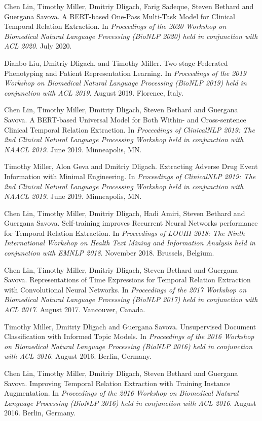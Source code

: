 \documentclass[letterpaper]{article}
\renewenvironment{itemize}{
  \begin{list}{}{
    \setlength{\leftmargin}{1.5em}
  }
}{
  \end{list}
}
\begin{document}
\begin{itemize}
\item Chen Lin, Timothy Miller, Dmitriy Dligach, Farig Sadeque, Steven Bethard and Guergana Savova. A BERT-based One-Pass Multi-Task Model for Clinical Temporal Relation Extraction. In \emph{Proceedings of the 2020 Workshop on Biomedical Natural Language Processing (BioNLP 2020) held in conjunction with ACL 2020}. July 2020.
\item Dianbo Liu, Dmitriy Dligach, and Timothy Miller. Two-stage Federated Phenotyping and Patient Representation Learning. In \emph{Proceedings of the 2019 Workshop on Biomedical Natural Language Processing (BioNLP 2019) held in conjunction with ACL 2019}. August 2019. Florence, Italy.
\item Chen Lin, Timothy Miller, Dmitriy Dligach, Steven Bethard and Guergana Savova. A BERT-based Universal Model for Both Within- and Cross-sentence Clinical Temporal Relation Extraction. In \emph{Proceedings of ClinicalNLP 2019: The 2nd Clinical Natural Language Processing Workshop held in conjunction with NAACL 2019}. June 2019. Minneapolis, MN.
\item Timothy Miller, Alon Geva and Dmitriy Dligach. Extracting Adverse Drug Event Information with Minimal Engineering. In \emph{Proceedings of ClinicalNLP 2019: The 2nd Clinical Natural Language Processing Workshop held in conjunction with NAACL 2019}. June 2019. Minneapolis, MN.
\item Chen Lin, Timothy Miller, Dmitriy Dligach, Hadi Amiri, Steven Bethard and Guergana Savova. Self-training improves Recurrent Neural Networks performance for Temporal Relation Extraction. In \emph{Proceedings of LOUHI 2018: The Ninth International Workshop on Health Text Mining and Information Analysis held in conjunction with EMNLP 2018}. November 2018. Brussels, Belgium.
\item Chen Lin, Timothy Miller, Dmitriy Dligach, Steven Bethard and Guergana Savova. Representations of Time Expressions for Temporal Relation Extraction with Convolutional Neural Networks. In \emph{Proceedings of the 2017 Workshop on Biomedical Natural Language Processing (BioNLP 2017) held in conjunction with ACL 2017}. August 2017. Vancouver, Canada.
\item Timothy Miller, Dmitriy Dligach and Guergana Savova. Unsupervised Document Classification with Informed Topic Models. In \emph{Proceedings of the 2016 Workshop on Biomedical Natural Language Processing (BioNLP 2016) held in conjunction with ACL 2016}. August 2016. Berlin, Germany.
\item Chen Lin, Timothy Miller, Dmitriy Dligach, Steven Bethard and Guergana Savova. Improving Temporal Relation Extraction with Training Instance Augmentation. In \emph{Proceedings of the 2016 Workshop on Biomedical Natural Language Processing (BioNLP 2016) held in conjunction with ACL 2016}. August 2016. Berlin, Germany.

\end{itemize}
\end{document}

